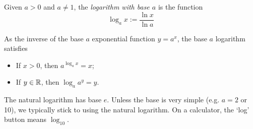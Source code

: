 \begin{defn}{}{}
Given $a>0$ and $a\neq 1$, the \emph{logarithm with base $a$} is the function
\[\log_ax :=\frac{\ln x}{\ln a}\]
\end{defn}

As the inverse of the base $a$ exponential function $y=a^x$, the base $a$ logarithm satisfies
\begin{itemize}
	\item If $x>0$, then $a^{\log_a x}=x$;
	\item If $y\in\mathbb{R}$, then $\log_a a^y=y$.
\end{itemize}
The natural logarithm has base $e$. Unless the base is very simple (e.g.{} $a=2$ or 10), we typically stick to using the natural logarithm. On a calculator, the `log' button means $\log_{10}$.






